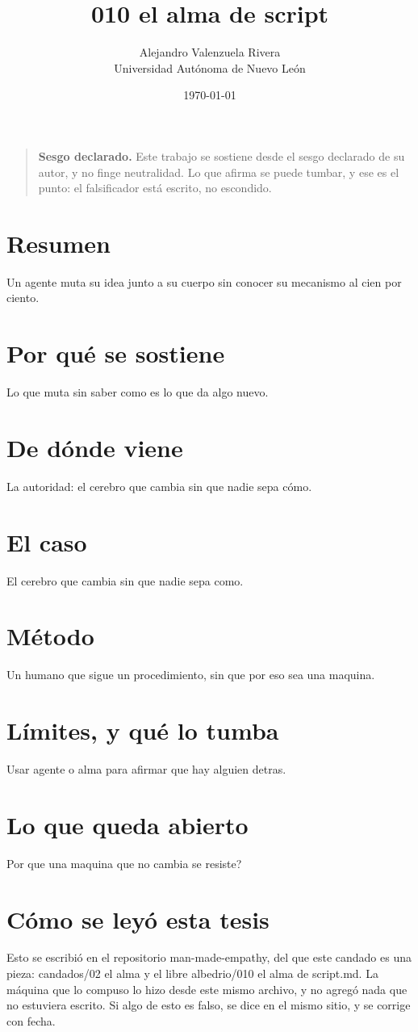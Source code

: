 \documentclass[11pt,a4paper]{article}
\title{010 el alma de script}
\author{Alejandro Valenzuela Rivera\\\small Universidad Autónoma de Nuevo León}
\date{\today}
\begin{document}
\maketitle

\begin{quote}
\textbf{Sesgo declarado.} Este trabajo se sostiene desde el sesgo declarado de su autor, y no finge neutralidad. Lo que afirma se puede tumbar, y ese es el punto: el falsificador está escrito, no escondido.
\end{quote}

\section*{Resumen}
Un agente muta su idea junto a su cuerpo sin conocer su mecanismo al cien por ciento.

\section{Por qué se sostiene}
Lo que muta sin saber como es lo que da algo nuevo.

\section{De dónde viene}
La autoridad: el cerebro que cambia sin que nadie sepa cómo.

\section{El caso}
El cerebro que cambia sin que nadie sepa como.

\section{Método}
Un humano que sigue un procedimiento, sin que por eso sea una maquina.

\section{Límites, y qué lo tumba}
Usar agente o alma para afirmar que hay alguien detras.

\section{Lo que queda abierto}
\textquestiondown{}Por que una maquina que no cambia se resiste?

\section*{Cómo se leyó esta tesis}
Esto se escribió en el repositorio man-made-empathy, del que este candado es una pieza: candados/02 el alma y el libre albedrio/010 el alma de script.md. La máquina que lo compuso lo hizo desde este mismo archivo, y no agregó nada que no estuviera escrito. Si algo de esto es falso, se dice en el mismo sitio, y se corrige con fecha.
\end{document}
